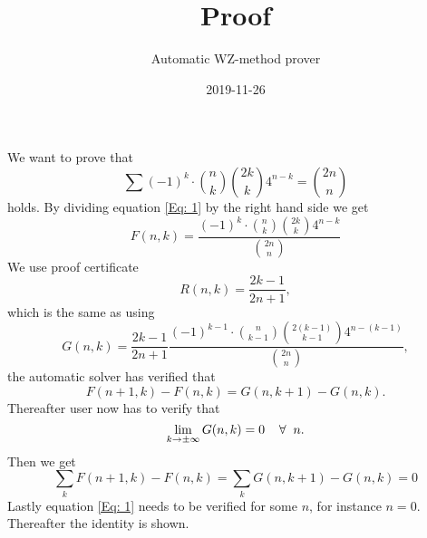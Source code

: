 \documentclass{article}
\title{Proof}
\author{Automatic WZ-method prover}
\date{2019-11-26}
\let\oldforall\forall
\renewcommand{\forall}{\hspace*{2mm}\oldforall\hspace*{1mm}}
\begin{document}
\maketitle
We want to prove that
\begin{equation}\label{Eq: 1}
\sum (-1)^k\cdot\binom{n}{k}\binom{2k}{k}4^{n-k}=\binom{2n}{n}
\end{equation}
holds. By dividing equation \ref{Eq: 1} by the right hand side we get
\begin{equation}
F(n,k)=\frac{(-1)^{k}\cdot\binom{n}{k}\binom{2k}{k}4^{n-k}}{\binom{2n}{n}}
\end{equation}
We use proof certificate
\begin{equation}
R(n,k)=\frac{2k-1}{2n+1},
\end{equation}
which is the same as using
\begin{equation}
G(n,k)=\frac{2k-1}{2n+1}\frac{(-1)^{k-1}\cdot\binom{n}{k-1}\binom{2(k-1)}{k-1}4^{n-(k-1)}}{\binom{2n}{n}},
\end{equation}
the automatic solver has  verified that
\begin{equation}\label{Eq: WZ1}
F(n+1,k)-F(n,k)=G(n,k+1)-G(n,k).
\end{equation}
Thereafter user now has to verify that
\begin{equation}
\lim_{k\to\pm\infty}G(n,k)=0\forall n.
\end{equation}
Then we get
\begin{equation}
\sum_k F(n+1,k)-F(n,k)=\sum_k G(n,k+1)-G(n,k)=0\end{equation}Lastly equation \ref{Eq: 1} needs to be verified for some $n$, for instance $n=0$. Thereafter the identity is shown.
\end{document}
